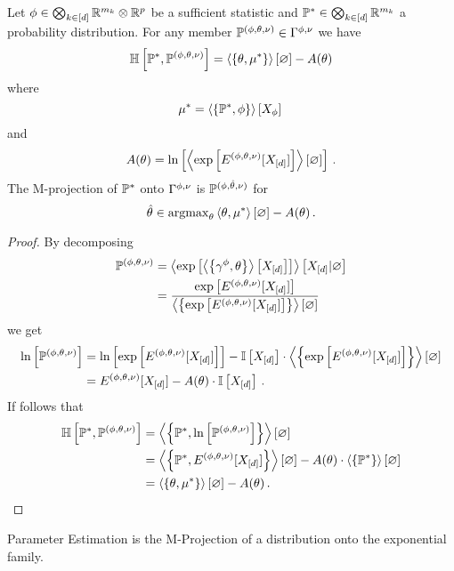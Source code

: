 \begin{lemma}
	Let $\sstat\in\facspace\otimes\rr^{\seldim}$ be a sufficient statistic and $\gendistribution\in\facspace$ a probability distribution.
	For any member $\expdist\in\expfamily$ we have
		\[ \centropyof{\gendistribution}{\expdist} = \sbcontraction{\canparam,\genmean} - \cumfunctionof{\canparam} \]
	where 
		\[ \genmean = \sbcontractionof{\gendistribution,\sstat}{\catvariableof{\sstat}} \,  \]
	and 
		\[ \cumfunction(\canparam) = \lnof{\contraction{\expof{\expenergy}}} \, . \]
	The M-projection of $\gendistribution$ onto $\expfamily$ is  $\expdistof{(\sstat,\estcanparam,\basemeasure)}$ for
		\[ \estcanparam\in \argmax_{\canparam}  \contraction{\canparam, \genmean} - \cumfunctionof{\canparam} \, .  \]
\end{lemma}
\begin{proof}
	By decomposing 
	\begin{align*}
		\expdist 	& = \normationof{\expof{\sbcontractionof{\sencsstat,\canparam}{\shortcatvariables}}}{\shortcatvariables} \\
				& = \frac{\expof{\expenergy}}{\sbcontraction{\expof{\expenergy}}}
	\end{align*}
	we get
	\begin{align*}
		\lnof{\expdist} & = \lnof{\expof{\expenergy}} - \onesat{\shortcatvariables} \cdot \sbcontraction{\expof{\expenergy}} \\ 
		& = \expenergy - \cumfunction(\canparam) \cdot \onesat{\shortcatvariables}  \, .
	\end{align*}
	If follows that
	\begin{align*}
		\centropyof{\gendistribution}{\expdist} 
		&=  \sbcontraction{\gendistribution,\lnof{\expdist}} \\
		&=  \sbcontraction{\gendistribution,\expenergy} - \cumfunction(\canparam) \cdot \sbcontraction{\gendistribution}   \\
		&= \sbcontraction{\canparam, \genmean} - \cumfunction(\canparam) \, . 
	\end{align*}
\end{proof}





Parameter Estimation is the M-Projection of a distribution onto the exponential family.

